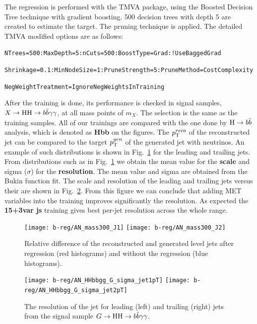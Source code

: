 The regression is performed with the TMVA package, using the Boosted Decision Tree technique with gradient boosting. 500 decision trees with depth 5 are created to estimate the target. 
The pruning technique is applied.
The detailed TMVA modified options are as follows:

\verb|NTrees=500:MaxDepth=5:nCuts=500:BoostType=Grad:!UseBaggedGrad|

\verb|Shrinkage=0.1:MinNodeSize=1:PruneStrength=5:PruneMethod=CostComplexity|

\verb|NegWeightTreatment=IgnoreNegWeightsInTraining|

After the training is done, its performance is checked in signal samples, $X\to\mathrm{H}\mathrm{H}\to b\bar{b}\gamma\gamma$, at all mass points of $m_X$.  
The selection is the same as the training samples. 
All of our trainings are compared with the one done by $\mathrm{H}\to b\bar{b}$ analysis, which is denoted as \textbf{Hbb} on the figures. 
The $p_{\mathrm{T}}^{reco}$ of the reconstructed jet can be compared to the target $p_{\mathrm{T}}^{gen}$ of the generated jet with neutrinos. 
An example of such distributions is shown in Fig.~\ref{fig:b-reg-pt-res} for the leading and trailing jets. 
From distributions such as in Fig.~\ref{fig:b-reg-pt-res} we obtain the mean value for the \textbf{scale} and sigma ($\sigma$) for the \textbf{resolution}. 
The mean value and sigma are obtained from the Bukin function fit. 
The scale and resolution of the leading and trailing jets versus their \PT are shown in Fig.~\ref{fig:b-reg-jet-res}. 
From this figure we can conclude that adding MET variables into the training improves significantly the resolution. 
As expected the \textbf{15+3var js} training gives best per-jet resolution across the whole \PT range.

\begin{figure}[h]
  \centering
  \texttt{[image: b-reg/AN\_mass300\_J1]}\hfil
  \texttt{[image: b-reg/AN\_mass300\_J2]}\hfil
  \caption{Relative \PT difference of the reconstructed and generated
    level jets after regression (red histograms) and without
    the regression (blue histograms).}
  \label{fig:b-reg-pt-res}
\end{figure}

\begin{figure}[h]
  \centering
  \texttt{[image: b-reg/AN\_HHbbgg\_G\_sigma\_jet1pT]}\hfil
  \texttt{[image: b-reg/AN\_HHbbgg\_G\_sigma\_jet2pT]}\hfil\\
  \caption{The resolution of the jet \PT for leading (left) and trailing (right) jets from the signal
    sample $G\to\mathrm{H}\mathrm{H}\to b\bar{b}\gamma\gamma$.}
  \label{fig:b-reg-jet-res}
\end{figure}
  
